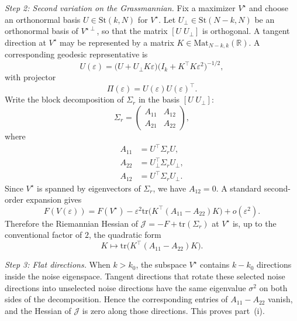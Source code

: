 \documentclass[11pt,letterpaper]{article}
\newcommand{\tr}{\mathrm{tr}}
\newcommand{\bR}{\mathbb{R}}
\newcommand{\cJ}{\mathcal{J}}
\begin{document}
\smallskip
\noindent
\emph{Step 2: Second variation on the Grassmannian.} Fix a maximizer $V^\star$ and choose an orthonormal basis $U\in\mathrm{St}(k,N)$ for $V^\star$. Let $U_\perp\in\mathrm{St}(N-k,N)$ be an orthonormal basis of $V^{\star\perp}$, so that the matrix $[U\;U_\perp]$ is orthogonal. A tangent direction at $V^\star$ may be represented by a matrix $K\in\mathrm{Mat}_{N-k,k}(\bR)$. A corresponding geodesic representative is
\begin{equation}
\label{eq:grassmann-geodesic-local}
U(\varepsilon)=\big(U+U_\perp K\varepsilon\big)\big(I_k+K^\top K\varepsilon^2\big)^{-1/2},
\end{equation}
with projector
\begin{equation*}
\Pi(\varepsilon)=U(\varepsilon)U(\varepsilon)^\top.
\end{equation*}
Write the block decomposition of $\Sigma_r$ in the basis $[U\;U_\perp]$:
\begin{equation}
\label{eq:block-sigma-r}
\Sigma_r =
\begin{pmatrix}
A_{11} & A_{12} \\
A_{21} & A_{22}
\end{pmatrix},
\end{equation}
where
\begin{equation*}
\begin{split}
A_{11}&=U^\top\Sigma_r U,\\
A_{22}&=U_\perp^\top\Sigma_r U_\perp,\\
A_{12}&=U^\top\Sigma_r U_\perp.
\end{split}
\end{equation*}
Since $V^\star$ is spanned by eigenvectors of $\Sigma_r$, we have $A_{12}=0$. A standard second-order expansion gives
\begin{equation}
\label{eq:second-var}
F(V(\varepsilon))=F(V^\star)-\varepsilon^2\tr\big(K^\top(A_{11}-A_{22})K\big)+o(\varepsilon^2).
\end{equation}
Therefore the Riemannian Hessian of $\cJ=-F+\tr(\Sigma_r)$ at $V^\star$ is, up to the conventional factor of $2$, the quadratic form
\begin{equation*}
K\mapsto \tr\!\big(K^\top(A_{11}-A_{22})K\big).
\end{equation*}

\smallskip
\noindent
\emph{Step 3: Flat directions.}
When $k>k_0$, the subspace $V^\star$ contains $k-k_0$ directions inside the noise eigenspace. Tangent directions that rotate these selected noise directions into unselected noise directions have the same eigenvalue $\sigma^2$ on both sides of the decomposition. Hence the corresponding entries of $A_{11}-A_{22}$ vanish, and the Hessian of $\cJ$ is zero along those directions. This proves part~(i).
\end{document}

